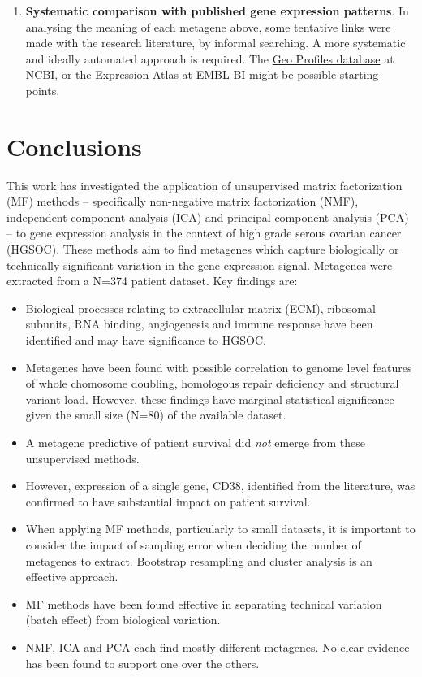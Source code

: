 \documentclass[tikz, 12pt,a4paper,oneside,fleqn]{article}
\begin{document}
\begin{enumerate}
\item
{\bf Systematic comparison with published gene expression patterns}.  In analysing the meaning of each metagene above, some tentative links were made with the research literature, by informal searching.   A more systematic and ideally automated approach is required.  The \href{https://www.ncbi.nlm.nih.gov/geoprofiles}{Geo Profiles database} at NCBI, or the \href{https://www.ebi.ac.uk/gxa/home}{Expression Atlas} at EMBL-BI might be possible starting points.

\end{enumerate}

\clearpage

\section{Conclusions}

This work has investigated the application of unsupervised matrix factorization (MF) methods  -- specifically non-negative matrix factorization (NMF), independent component analysis (ICA) and principal component analysis (PCA) -- to gene expression analysis in the context of high grade serous ovarian cancer (HGSOC).  These methods aim to find metagenes which capture biologically or technically significant variation in the gene expression signal.  Metagenes were extracted from a N=374 patient dataset. Key findings are:
\begin{itemize}
\item
Biological processes relating to  extracellular matrix (ECM), ribosomal subunits, RNA binding, angiogenesis and immune response have been identified and may have significance to HGSOC.
\item
Metagenes have been found with possible correlation to genome level features of whole chomosome doubling, homologous repair deficiency and structural variant load.  However, these findings have marginal statistical significance given the small size (N=80) of the available dataset.
\item
A metagene predictive of patient survival did \emph{not} emerge from these unsupervised methods.
\item
However, expression of a single gene, CD38, identified from the literature, was confirmed to have substantial impact on patient survival.
\item
When applying MF methods, particularly to small datasets, it is important to consider the impact of sampling error when deciding the number of metagenes to extract.  Bootstrap resampling and cluster analysis is an effective approach.
\item
MF methods have been found effective in separating technical variation (batch effect) from biological variation.
\item
NMF, ICA and PCA each find mostly different metagenes. No clear evidence has been found to support one over the others.

\end{itemize}
\end{document}
